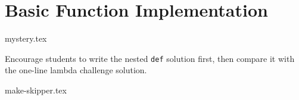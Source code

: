 \documentclass{exam}
\begin{document}
\section{Basic Function Implementation}
\begin{questions}
    {mystery.tex}
    \begin{questionmeta}
        Encourage students to write the nested \lstinline{def} solution first,
        then compare it with the one-line lambda challenge solution.
    \end{questionmeta}

    {make-skipper.tex}
\end{questions}
\end{document}
